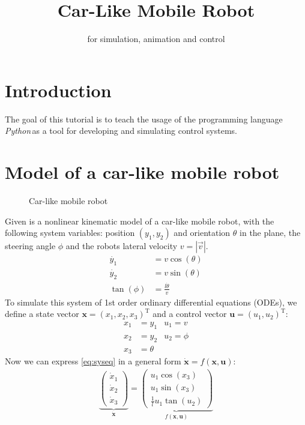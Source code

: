 \documentclass[a4paper,11pt,headings=standardclasses]{scrartcl}%
\title{Car-Like Mobile Robot}
\subtitle{\py for simulation, animation and control}%
\author{}
\date{}
\newcommand{\py}{\emph{Python}\,}
\begin{document}
\maketitle%
\tableofcontents
\newpage
\section{Introduction}
The goal of this tutorial is to teach the usage of the programming language \py as a tool for developing and simulating control systems.

\section{Model of a car-like mobile robot}
\begin{figure}[ht]
	\centering
	\def\svgwidth{0.7\textwidth}
	
	\caption{Car-like mobile robot}
	\label{fig:car}
\end{figure}
Given is a nonlinear kinematic model of a car-like mobile robot, with the following system variables: position $(y_1, y_2)$ and orientation $\theta$ in the plane, the steering angle $\phi$ and the robots lateral velocity $v=\left| \vec{v} \right| $. 
\begin{subequations}\label{eq:syseq}
\begin{align}
\dot{y_1}&=v \cos (\theta) \\
\dot{y_2}&=v \sin (\theta) \\
\tan(\phi) &= \frac{l\dot{\theta}}{v}
\end{align}
\end{subequations}
To simulate this system of 1st order ordinary differential equations (ODEs), we define a state vector $\mathbf{x}=(x_1,x_2,x_3)^\mathrm{T}$ and a control vector $\mathbf{u}=(u_1,u_2)^\mathrm{T}$:
\begin{align*}
x_1 &= y_1 & u_1 = v\\
x_2 &= y_2 & u_2 = \phi \\
x_3 &= \theta 
\end{align*}
Now we can express \eqref{eq:syseq} in a general form $\dot{\mathbf{x}}=f(\mathbf{x},\mathbf{u})$:
\label{eq:ss_system}
\begin{align}
\underbrace{\begin{pmatrix} \dot{x}_1 \\ \dot{x}_2 \\ \dot{x}_3 \end{pmatrix}}_{\dot{\mathbf{x}}} = \underbrace{\begin{pmatrix}  u_1 \cos(x_3) \\ u_1 \sin(x_3) \\ \frac{1}{l}u_1 \tan(u_2) \end{pmatrix}}_{f(\mathbf{x},\mathbf{u})}
\end{align}
\end{document}
